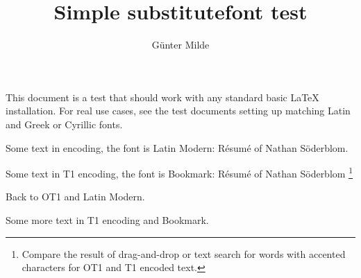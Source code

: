 \documentclass[a4paper]{article}
\title{Simple substitutefont test}
\author{Günter Milde}
\begin{document}
\maketitle

This document is a test that should work with any standard basic LaTeX
installation. For real use cases, see the test documents setting up matching
Latin and Greek or Cyrillic fonts.

Some text in \encodingdefault{} encoding, the font is Latin Modern:
Résumé of Nathan Söderblom.


\selectfont

Some text in T1 encoding, the font is Bookmark: Résumé of Nathan Söderblom%
\footnote{Compare the result of drag-and-drop or text search for words with
accented characters for OT1 and T1 encoded text.}

\selectfont

Back to OT1 and Latin Modern.




\selectfont

Some more text in T1 encoding and Bookmark.
\end{document}

